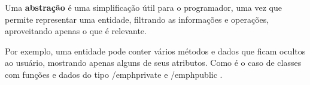 ﻿Uma \textbf{abstração} é uma simplificação útil para o programador, uma vez que
permite representar uma entidade, filtrando as informações e operações,
aproveitando apenas o que é relevante.

Por exemplo, uma entidade pode conter vários métodos e dados que ficam ocultos
ao usuário, mostrando apenas alguns de seus atributos. Como é o caso de classes
com funções e dados do tipo /emph{private} e /emph{public} .

